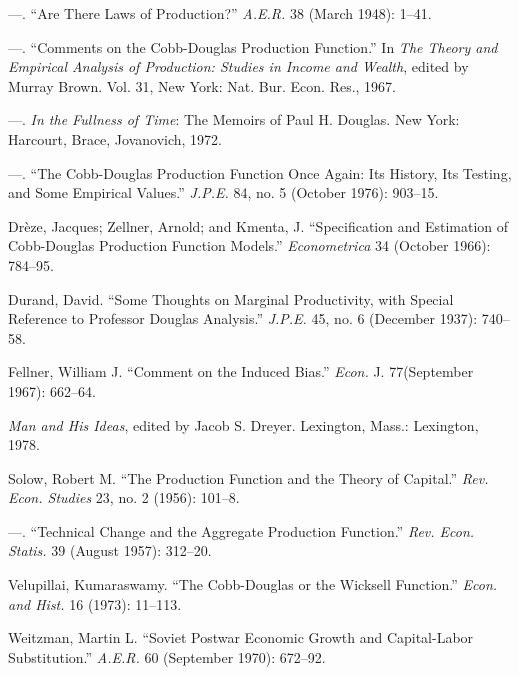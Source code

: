 \documentclass{article}
\begin{document}
\begin{thebibliography}{00}
---. \foreignlanguage{english}{``Are There Laws of Production?'' \emph{A.E.R.} 38 (March 1948): 1--41.}

---. \foreignlanguage{english}{``Comments on the Cobb-Douglas Production Function.'' In \emph{The Theory and Empirical Analysis of Production: Studies in Income and Wealth}, edited by Murray Brown. Vol. 31, New York: Nat. Bur. Econ. Res., 1967.}

---. \foreignlanguage{english}{\emph{In the Fullness of Time}: The Memoirs of Paul H. Douglas. New York: Harcourt, Brace, Jovanovich, 1972.}

---. \foreignlanguage{english}{``The Cobb-Douglas Production Function Once Again: Its History, Its Testing, and Some Empirical Values.'' \emph{J.P.E.} 84, no. 5 (October 1976): 903--15.}

Dr\`eze, Jacques; Zellner, Arnold; and Kmenta, J. \foreignlanguage{english}{``Specification and Estimation of Cobb-Douglas Production Function Models.'' \emph{Econometrica} 34 (October 1966): 784--95.}

Durand, David. \foreignlanguage{english}{``Some Thoughts on Marginal Productivity, with Special Reference to Professor Douglas Analysis.'' \emph{J.P.E.} 45, no. 6 (December 1937): 740--58.}

Fellner, William J. \foreignlanguage{english}{``Comment on the Induced Bias.'' \emph{Econ.} J. 77(September 1967): 662--64.}


\emph{Man and His Ideas}, edited by Jacob S. Dreyer. Lexington, Mass.: Lexington, 1978.

Solow, Robert M. \foreignlanguage{english}{``The Production Function and the Theory of Capital.'' \emph{Rev. Econ. Studies} 23, no. 2 (1956): 101--8.}

---. ``Technical Change and the Aggregate Production Function.'' \emph{Rev. Econ. Statis.} 39 (August 1957): 312--20.

Velupillai, Kumaraswamy. \foreignlanguage{english}{``The Cobb-Douglas or the Wicksell Function.'' \emph{Econ. and Hist.} 16 (1973): 11--113.}

Weitzman, Martin L. \foreignlanguage{english}{``Soviet Postwar Economic Growth and Capital-Labor Substitution.'' \emph{A.E.R.} 60 (September 1970): 672--92.}


\end{thebibliography}
\end{document}
